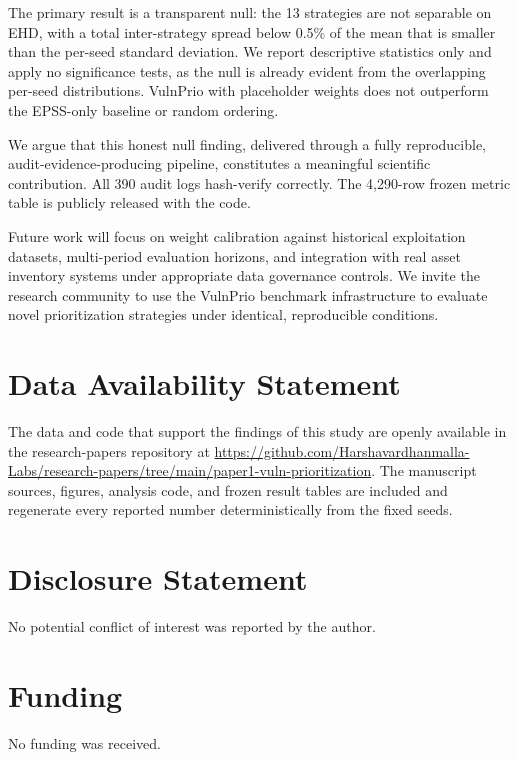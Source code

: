 \documentclass[journal]{IEEEtran}
\begin{document}
The primary result is a transparent null: the 13
strategies are not separable on EHD, with a total inter-strategy
spread below 0.5\% of the mean that is smaller than the per-seed
standard deviation.  We report descriptive statistics only and
apply no significance tests, as the null is already evident from
the overlapping per-seed distributions.  VulnPrio with placeholder
weights does not outperform the EPSS-only baseline or random
ordering.

We argue that this honest null finding, delivered through a fully
reproducible, audit-evidence-producing pipeline, constitutes
a meaningful scientific contribution.  All 390 audit logs
hash-verify correctly.  The 4,290-row frozen metric table is
publicly released with the code.

Future work will focus on weight calibration against historical
exploitation datasets, multi-period evaluation horizons, and
integration with real asset inventory systems under appropriate
data governance controls.  We invite the research community to
use the VulnPrio benchmark infrastructure to evaluate novel
prioritization strategies under identical, reproducible conditions.

\section*{Data Availability Statement}
The data and code that support the findings of this study are openly available in the research-papers repository at \url{https://github.com/Harshavardhanmalla-Labs/research-papers/tree/main/paper1-vuln-prioritization}. The manuscript sources, figures, analysis code, and frozen result tables are included and regenerate every reported number deterministically from the fixed seeds.

\section*{Disclosure Statement}
No potential conflict of interest was reported by the author.

\section*{Funding}
No funding was received.

\balance
\end{document}
